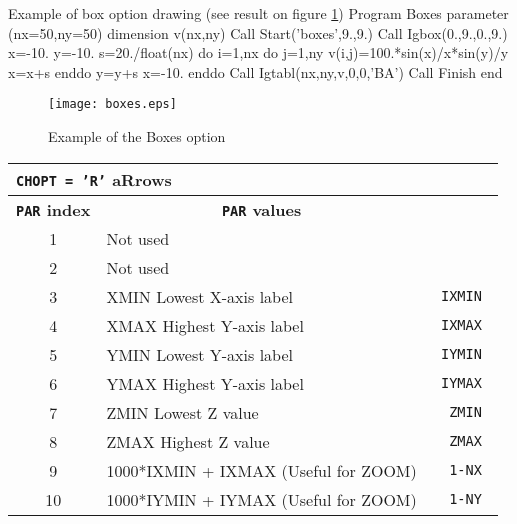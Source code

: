 \bigskip

\begin{XMPt}{Example of box option drawing 
             (see result on figure \ref{BOXES})}
      Program Boxes
      parameter (nx=50,ny=50)
      dimension v(nx,ny)
      Call Start('boxes',9.,9.)
      Call Igbox(0.,9.,0.,9.)
      x=-10.
      y=-10.
      s=20./float(nx)
      do i=1,nx
         do j=1,ny
            v(i,j)=100.*sin(x)/x*sin(y)/y
            x=x+s
         enddo
         y=y+s
         x=-10.
      enddo
      Call Igtabl(nx,ny,v,0,0,'BA')
      Call Finish
      end
\end{XMPt}

\vfill
\clearpage

\begin{figure}[p]
\begin{center} \texttt{[image: boxes.eps]}\end{center}
\caption{Example of the \protect{} Boxes option}
\label{BOXES}
\end{figure}

\vfill
\clearpage

\begin{center}
\begin{tabular}{||c|p{11cm}|>{\tt}r||}
\hline
\multicolumn{3}{||l||}{\bf {\tt CHOPT = 'R'} aRrows}       \\
\hline
\multicolumn{1}{||c|}{\bf {\tt PAR} index}       &
\multicolumn{1}{c|}{\bf {\tt PAR} values}        &
\multicolumn{1}{c||}{\bf default}                          \\
\hline
1  & Not used                                                       &         \\
2  & Not used                                                       &         \\
3  & XMIN Lowest X-axis label                                       &   IXMIN \\
4  & XMAX Highest Y-axis label                                      &   IXMAX \\
5  & YMIN Lowest Y-axis label                                       &   IYMIN \\
6  & YMAX Highest Y-axis label                                      &   IYMAX \\
7  & ZMIN Lowest Z value                                            &   ZMIN  \\
8  & ZMAX Highest Z value                                           &   ZMAX  \\
9  & 1000*IXMIN + IXMAX (Useful for ZOOM)                           &   1-NX  \\
10 & 1000*IYMIN + IYMAX (Useful for ZOOM)                           &   1-NY  \\
\hline
\end{tabular}
\end{center}

